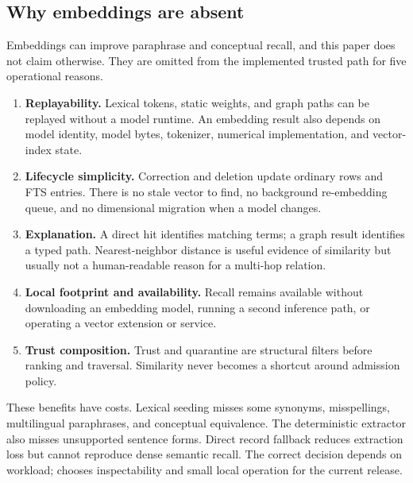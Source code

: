 \subsection{Why embeddings are absent}

Embeddings can improve paraphrase and conceptual recall, and this paper does not claim otherwise. They are omitted from the implemented trusted path for five operational reasons.

\begin{enumerate}
  \item \textbf{Replayability.} Lexical tokens, static weights, and graph paths can be replayed without a model runtime. An embedding result also depends on model identity, model bytes, tokenizer, numerical implementation, and vector-index state.
  \item \textbf{Lifecycle simplicity.} Correction and deletion update ordinary rows and FTS entries. There is no stale vector to find, no background re-embedding queue, and no dimensional migration when a model changes.
  \item \textbf{Explanation.} A direct hit identifies matching terms; a graph result identifies a typed path. Nearest-neighbor distance is useful evidence of similarity but usually not a human-readable reason for a multi-hop relation.
  \item \textbf{Local footprint and availability.} Recall remains available without downloading an embedding model, running a second inference path, or operating a vector extension or service.
  \item \textbf{Trust composition.} Trust and quarantine are structural filters before ranking and traversal. Similarity never becomes a shortcut around admission policy.
\end{enumerate}

These benefits have costs. Lexical seeding misses some synonyms, misspellings, multilingual paraphrases, and conceptual equivalence. The deterministic extractor also misses unsupported sentence forms. Direct record fallback reduces extraction loss but cannot reproduce dense semantic recall. The correct decision depends on workload; \system{} chooses inspectability and small local operation for the current release.

